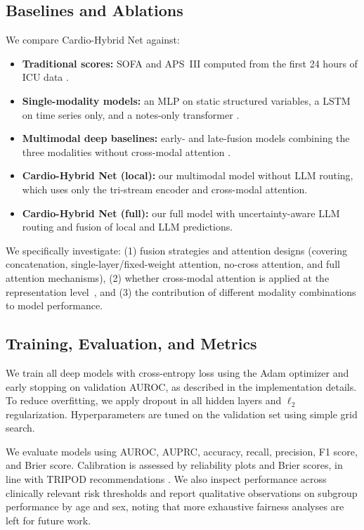 \documentclass{article}
\begin{document}
\subsection{Baselines and Ablations}

We compare Cardio-Hybrid Net against:

\begin{itemize}
  \item \textbf{Traditional scores:} SOFA and APS~III computed from the first 24 hours of ICU data \cite{Vincent1996SOFA,Knaus1991APACHEIII}.
  \item \textbf{Single-modality models:} an MLP on static structured variables, a LSTM on time series only, and a notes-only transformer \cite{Khadanga2019ICUNotes,Shukla2020IntegratingTSNotes,Deznabi2021MortalityNotes}.
  \item \textbf{Multimodal deep baselines:} early- and late-fusion models combining the three modalities without cross-modal attention \cite{Lyu2023MultimodalTransformer,Kumar2023MultimodalICUPrediction}.
  \item \textbf{Cardio-Hybrid Net (local):} our multimodal model without LLM routing, which uses only the tri-stream encoder and cross-modal attention.
  \item \textbf{Cardio-Hybrid Net (full):} our full model with uncertainty-aware LLM routing and fusion of local and LLM predictions.
\end{itemize}

We specifically investigate: (1) fusion strategies and attention designs (covering concatenation, single-layer/fixed-weight attention, no-cross attention, and full attention mechanisms), (2) whether cross-modal attention is applied at the representation level~\cite{XAI2023MultimodalICU}, and (3) the contribution of different modality combinations to model performance.

\subsection{Training, Evaluation, and Metrics}

We train all deep models with cross-entropy loss using the Adam optimizer and early stopping on validation AUROC, as described in the implementation details.
To reduce overfitting, we apply dropout in all hidden layers and $\ell_2$ regularization.
Hyperparameters are tuned on the validation set using simple grid search.

We evaluate models using AUROC, AUPRC, accuracy, recall, precision, F1 score, and Brier score.
Calibration is assessed by reliability plots and Brier scores, in line with TRIPOD recommendations \cite{Moons2015TRIPOD}.
We also inspect performance across clinically relevant risk thresholds and report qualitative observations on subgroup performance by age and sex, noting that more exhaustive fairness analyses are left for future work.
\end{document}
